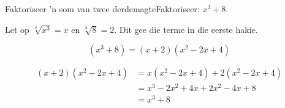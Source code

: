 \begin{wex}{Faktoriseer 'n som van twee derdemagte}{Faktoriseer: $x^{3}+8$.}
{
Let op $\sqrt[3]{x^{3}} = x$ en $\sqrt[3]{8} = 2$. Dit gee die terme in die eerste hakie.

\begin{equation*}
  (x^{3} +8) = (x+2)(x^{2}-2x+4)
\end{equation*}

\begin{align*}
  (x+2)(x^{2}-2x+4) &= x(x^{2}-2x+4)+2(x^{2}-2x+4)\\
		   &=x^{3}-2x^{2}+4x+2x^{2}-4x+8\\
		   &=x^{3}+8\\
\end{align*}
}
\end{wex}

